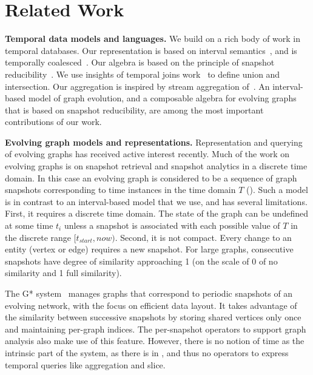 \section{Related Work}
\label{sec:related}

{\bf Temporal data models and languages.} We build on a rich body of
work in temporal databases.  Our \tg representation is based on
interval semantics~\cite{DBLP:reference/db/JensenS09k}, and is
temporally coalesced~\cite{DBLP:conf/vldb/BohlenSS96}.  Our algebra is
based on the principle of snapshot
reducibility~\cite{DBLP:reference/db/Bohlen092}.  We use insights of
temporal joins work~\cite{Gao2005} to define \tg union and
intersection.  Our \tg aggregation is inspired by stream aggregation
of~\cite{Li2005}.  An interval-based model of graph evolution, and a
composable algebra for evolving graphs that is based on snapshot
reducibility, are among the most important contributions of our work.

{\bf Evolving graph models and representations.}  Representation and
querying of evolving graphs has received active interest
recently. Much of the work on evolving graphs is on snapshot retrieval
and snapshot analytics in a discrete time domain.  In this case an
evolving graph is considered to be a sequence of graph snapshots
corresponding to time instances in the time domain $T$
(\cite{Khurana2013,DBLP:journals/tos/MiaoHLWYZPCC15,Ren2011}).  Such a
model is in contrast to an interval-based model that we use, and has
several limitations.  First, it requires a discrete time domain. The
state of the graph can be undefined at some time $t_i$ unless a
snapshot is associated with each possible value of $T$ in the discrete
range $[t_{start}, now)$.  Second, it is not compact.  Every change to
  an entity (vertex or edge) requires a new snapshot.  For large
  graphs, consecutive snapshots have degree of similarity approaching
  1 (on the scale of 0 of no similarity and 1 full similarity).

The G* system~\cite{Labouseur2015} manages graphs that correspond to
periodic snapshots of an evolving network, with the focus on efficient
data layout.  It takes advantage of the similarity between successive
snapshots by storing shared vertices only once and maintaining
per-graph indices.  The per-snapshot operators to support graph
analysis also make use of this feature.  However, there is no notion
of time as the intrinsic part of the system, as there is in \ql, and
thus no operators to express temporal queries like aggregation and
slice.

